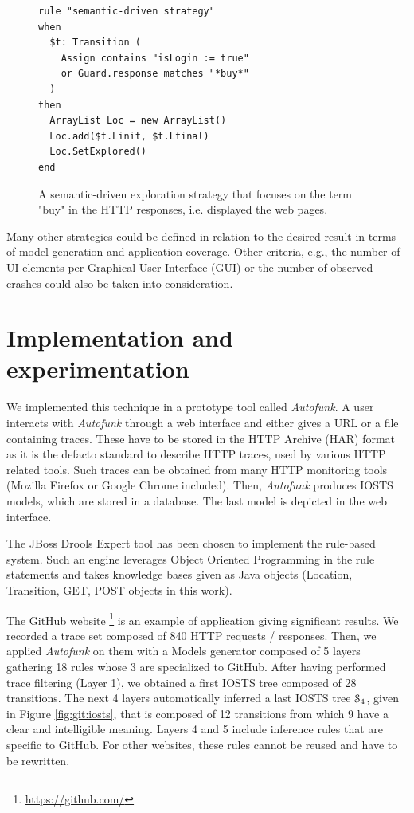 \begin{figure}[h]
\begin{framed}
\begin{BVerbatim}
rule "semantic-driven strategy"
when
  $t: Transition (
    Assign contains "isLogin := true"
    or Guard.response matches "*buy*"
  )
then
  ArrayList Loc = new ArrayList()
  Loc.add($t.Linit, $t.Lfinal)
  Loc.SetExplored()
end
\end{BVerbatim}
\end{framed}

\caption{A semantic-driven exploration strategy that focuses on
the term "buy" in the HTTP responses, i.e. displayed the web
pages.}
\label{fig:rule:semdriven}
\end{figure}

Many other strategies could be defined in relation to the desired
result in terms of model generation and application coverage.
Other criteria, e.g., the number of UI elements per Graphical User
Interface (GUI) or the number of observed crashes could also be
taken into consideration.


\section{Implementation and experimentation}
\label{sec:modelinf:webapps:exp}

We implemented this technique in a prototype tool called
\textit{Autofunk}. A user interacts with \textit{Autofunk} through a web
interface and either gives a URL  or a file containing traces.
These have to be stored in the HTTP Archive (HAR) format as it is
the defacto standard to describe HTTP traces, used by various
HTTP related tools. Such traces can be obtained from many HTTP
monitoring tools (Mozilla Firefox or Google Chrome included).
Then, \textit{Autofunk} produces IOSTS models, which are stored in a
database. The last model is depicted in the web interface.

The JBoss Drools Expert tool has been chosen to implement the
rule-based system. Such an engine leverages Object Oriented
Programming in the rule statements and takes knowledge bases
given as Java objects (Location, Transition, GET, POST objects in
this work).

The GitHub website \footnote{\url{https://github.com/}} is an example
of application giving significant results. We recorded a trace
set composed of 840 HTTP requests / responses. Then, we applied
\textit{Autofunk} on them with a Models generator composed of 5 layers
gathering 18 rules whose 3 are specialized to GitHub. After
having performed trace filtering (Layer 1), we obtained a first
IOSTS tree composed of 28 transitions. The next 4 layers
automatically inferred a last IOSTS tree $\EuScript{S}_4$, given
in Figure \ref{fig:git:iosts}, that is composed of 12 transitions
from which 9 have a clear and intelligible meaning. Layers 4 and
5 include inference rules that are specific to GitHub. For other
websites, these rules cannot be reused and have to be rewritten.

